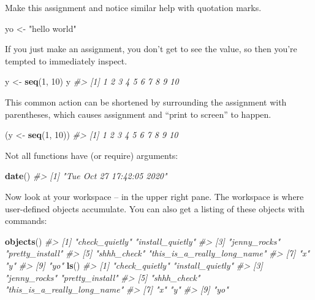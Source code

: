 \documentclass[
]{book}
\newenvironment{Shaded}{\begin{snugshade}}{\end{snugshade}}
\newcommand{\CommentTok}[1]{\textcolor[rgb]{0.56,0.35,0.01}{\textit{#1}}}
\newcommand{\DecValTok}[1]{\textcolor[rgb]{0.00,0.00,0.81}{#1}}
\newcommand{\KeywordTok}[1]{\textcolor[rgb]{0.13,0.29,0.53}{\textbf{#1}}}
\newcommand{\NormalTok}[1]{#1}
\newcommand{\StringTok}[1]{\textcolor[rgb]{0.31,0.60,0.02}{#1}}
\begin{document}
Make this assignment and notice similar help with quotation marks.

\begin{Shaded}
\begin{Highlighting}[]
\NormalTok{yo <-}\StringTok{ "hello world"}
\end{Highlighting}
\end{Shaded}

If you just make an assignment, you don't get to see the value, so then you're tempted to immediately inspect.

\begin{Shaded}
\begin{Highlighting}[]
\NormalTok{y <-}\StringTok{ }\KeywordTok{seq}\NormalTok{(}\DecValTok{1}\NormalTok{, }\DecValTok{10}\NormalTok{)}
\NormalTok{y}
\CommentTok{#>  [1]  1  2  3  4  5  6  7  8  9 10}
\end{Highlighting}
\end{Shaded}

This common action can be shortened by surrounding the assignment with parentheses, which causes assignment and ``print to screen'' to happen.

\begin{Shaded}
\begin{Highlighting}[]
\NormalTok{(y <-}\StringTok{ }\KeywordTok{seq}\NormalTok{(}\DecValTok{1}\NormalTok{, }\DecValTok{10}\NormalTok{))}
\CommentTok{#>  [1]  1  2  3  4  5  6  7  8  9 10}
\end{Highlighting}
\end{Shaded}

Not all functions have (or require) arguments:

\begin{Shaded}
\begin{Highlighting}[]
\KeywordTok{date}\NormalTok{()}
\CommentTok{#> [1] "Tue Oct 27 17:42:05 2020"}
\end{Highlighting}
\end{Shaded}

Now look at your workspace -- in the upper right pane. The workspace is where user-defined objects accumulate. You can also get a listing of these objects with commands:

\begin{Shaded}
\begin{Highlighting}[]
\KeywordTok{objects}\NormalTok{()}
\CommentTok{#> [1] "check_quietly"              "install_quietly"           }
\CommentTok{#> [3] "jenny_rocks"                "pretty_install"            }
\CommentTok{#> [5] "shhh_check"                 "this_is_a_really_long_name"}
\CommentTok{#> [7] "x"                          "y"                         }
\CommentTok{#> [9] "yo"}
\KeywordTok{ls}\NormalTok{()}
\CommentTok{#> [1] "check_quietly"              "install_quietly"           }
\CommentTok{#> [3] "jenny_rocks"                "pretty_install"            }
\CommentTok{#> [5] "shhh_check"                 "this_is_a_really_long_name"}
\CommentTok{#> [7] "x"                          "y"                         }
\CommentTok{#> [9] "yo"}
\end{Highlighting}
\end{Shaded}
\end{document}
